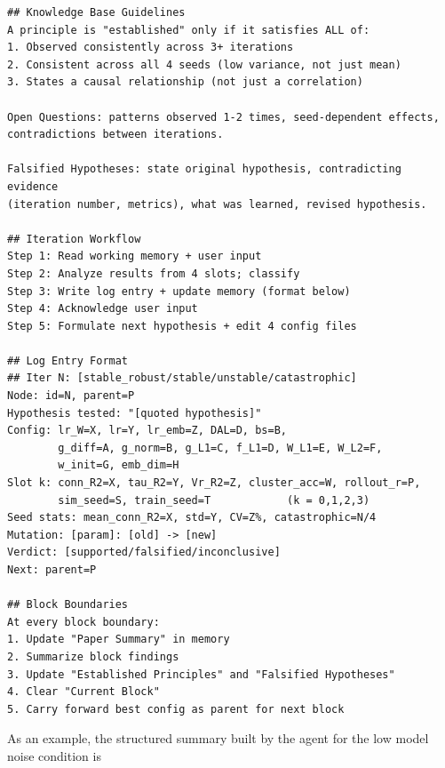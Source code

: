 \documentclass{article}
\begin{document}
\begin{tiny}
\begin{verbatim}
## Knowledge Base Guidelines
A principle is "established" only if it satisfies ALL of:
1. Observed consistently across 3+ iterations
2. Consistent across all 4 seeds (low variance, not just mean)
3. States a causal relationship (not just a correlation)

Open Questions: patterns observed 1-2 times, seed-dependent effects,
contradictions between iterations.

Falsified Hypotheses: state original hypothesis, contradicting evidence
(iteration number, metrics), what was learned, revised hypothesis.

## Iteration Workflow
Step 1: Read working memory + user input
Step 2: Analyze results from 4 slots; classify
Step 3: Write log entry + update memory (format below)
Step 4: Acknowledge user input
Step 5: Formulate next hypothesis + edit 4 config files

## Log Entry Format
## Iter N: [stable_robust/stable/unstable/catastrophic]
Node: id=N, parent=P
Hypothesis tested: "[quoted hypothesis]"
Config: lr_W=X, lr=Y, lr_emb=Z, DAL=D, bs=B,
        g_diff=A, g_norm=B, g_L1=C, f_L1=D, W_L1=E, W_L2=F,
        w_init=G, emb_dim=H
Slot k: conn_R2=X, tau_R2=Y, Vr_R2=Z, cluster_acc=W, rollout_r=P,
        sim_seed=S, train_seed=T            (k = 0,1,2,3)
Seed stats: mean_conn_R2=X, std=Y, CV=Z%, catastrophic=N/4
Mutation: [param]: [old] -> [new]
Verdict: [supported/falsified/inconclusive]
Next: parent=P

## Block Boundaries
At every block boundary:
1. Update "Paper Summary" in memory
2. Summarize block findings
3. Update "Established Principles" and "Falsified Hypotheses"
4. Clear "Current Block"
5. Carry forward best config as parent for next block
\end{verbatim}
\end{tiny}


As an example, the structured summary built by the agent for the low model noise condition is
\end{document}

